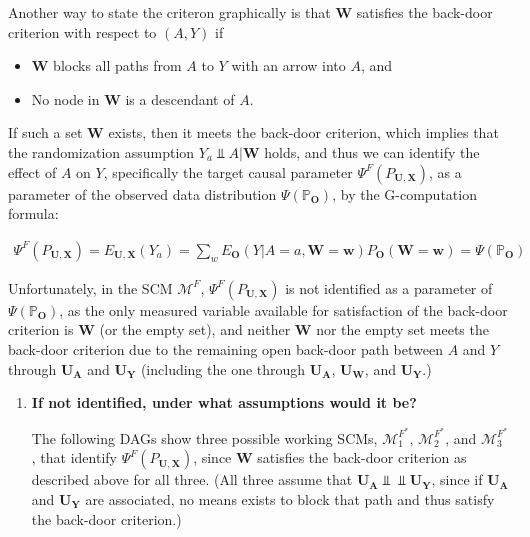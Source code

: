 \documentclass{article}\usepackage[]{graphicx}\usepackage[]{xcolor}
\begin{document}
\begin{enumerate}[label=\textbf{\arabic*.}]
Another way to state the criteron graphically is that $\bm{W}$ satisfies the back-door criterion with respect to $(A,Y)$ if
  
  \begin{itemize}
    \item $\bm{W}$ blocks all paths from $A$ to $Y$ with an arrow into $A$, and
    \item No node in $\bm{W}$ is a descendant of $A$.
  \end{itemize}
  
If such a set $\bm{W}$ exists, then it meets the back-door criterion, which implies that the randomization assumption $Y_a \Perp \!\!\!\! A|\bm{W}$ holds, and thus we can identify the effect of $A$ on $Y$, specifically the target causal parameter $\Psi^F(P_{\bm{U},\bm{X}})$, as a parameter of the observed data distribution $\Psi(\mathbb{P}_{\bm{O}})$, by the G-computation formula:

\begin{align*}
\Psi^F(P_{\bm{U},\bm{X}}) = E_{\bm{U},\bm{X}}(Y_a)=\sum_{w}E_{\bm{O}}(Y|A=a,\bm{W}=\bm{w})P_{\bm{O}}(\bm{W}=\bm{w})=\Psi(\mathbb{P}_{\bm{O}})
\end{align*}
  
Unfortunately, in the SCM $\mathcal{M}^{F}$, $\Psi^F(P_{\bm{U},\bm{X}})$ is not identified as a parameter of $\Psi(\mathbb{P}_{\bm{O}})$, as the only measured variable available for satisfaction of the back-door criterion is $\bm{W}$ (or the empty set), and neither $\bm{W}$ nor the empty set meets the back-door criterion due to the remaining open back-door path between $A$ and $Y$ through $\bm{U_A}$ and $\bm{U_Y}$ (including the one through $\bm{U_A}$, $\bm{U_W}$, and $\bm{U_Y}$.)
  
  \begin{enumerate}[label=\textbf{(\alph*)}]
  
    \item \textbf{If not identified, under what assumptions would it be?}
    
The following DAGs show three possible working SCMs, $\mathcal{M}^{F^*}_1$, $\mathcal{M}^{F^*}_2$, and $\mathcal{M}^{F^*}_3$, that identify $\Psi^F(P_{\bm{U},\bm{X}})$, since $\bm{W}$ satisfies the back-door criterion as described above for all three. (All three assume that $\bm{U_A} \Perp \!\!\!\! \Perp \bm{U_Y}$, since if $\bm{U_A}$ and $\bm{U_Y}$ are associated, no means exists to block that path and thus satisfy the back-door criterion.)
    
\pagebreak
    

\end{enumerate}
\end{enumerate}
\end{document}
